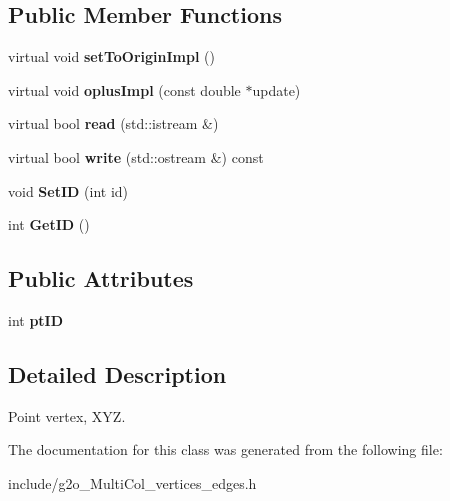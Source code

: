\subsection*{Public Member Functions}
\begin{DoxyCompactItemize}
\item 
virtual void {\bfseries set\+To\+Origin\+Impl} ()\hypertarget{classMultiColSLAM_1_1VertexPointXYZ_a9557cd0e17b562bb172908d03546cafd}{}\label{classMultiColSLAM_1_1VertexPointXYZ_a9557cd0e17b562bb172908d03546cafd}

\item 
virtual void {\bfseries oplus\+Impl} (const double $\ast$update)\hypertarget{classMultiColSLAM_1_1VertexPointXYZ_a36702c3d044af4dcf713bb428a35b866}{}\label{classMultiColSLAM_1_1VertexPointXYZ_a36702c3d044af4dcf713bb428a35b866}

\item 
virtual bool {\bfseries read} (std\+::istream \&)\hypertarget{classMultiColSLAM_1_1VertexPointXYZ_afe359248a103b4908bd6c0e6a6bc0f41}{}\label{classMultiColSLAM_1_1VertexPointXYZ_afe359248a103b4908bd6c0e6a6bc0f41}

\item 
virtual bool {\bfseries write} (std\+::ostream \&) const \hypertarget{classMultiColSLAM_1_1VertexPointXYZ_ad6bc53b4c5950ca6495a75753b618498}{}\label{classMultiColSLAM_1_1VertexPointXYZ_ad6bc53b4c5950ca6495a75753b618498}

\item 
void {\bfseries Set\+ID} (int id)\hypertarget{classMultiColSLAM_1_1VertexPointXYZ_a8d08fcbfb1327472eba01ab3e40caaa4}{}\label{classMultiColSLAM_1_1VertexPointXYZ_a8d08fcbfb1327472eba01ab3e40caaa4}

\item 
int {\bfseries Get\+ID} ()\hypertarget{classMultiColSLAM_1_1VertexPointXYZ_afc60be4d7a2318d72813a296ddb6d740}{}\label{classMultiColSLAM_1_1VertexPointXYZ_afc60be4d7a2318d72813a296ddb6d740}

\end{DoxyCompactItemize}
\subsection*{Public Attributes}
\begin{DoxyCompactItemize}
\item 
int {\bfseries pt\+ID}\hypertarget{classMultiColSLAM_1_1VertexPointXYZ_aa8483e9fe70fa64e8cb0c9464344bf4c}{}\label{classMultiColSLAM_1_1VertexPointXYZ_aa8483e9fe70fa64e8cb0c9464344bf4c}

\end{DoxyCompactItemize}


\subsection{Detailed Description}
Point vertex, X\+YZ. 

The documentation for this class was generated from the following file\+:\begin{DoxyCompactItemize}
\item 
include/g2o\+\_\+\+Multi\+Col\+\_\+vertices\+\_\+edges.\+h\end{DoxyCompactItemize}

